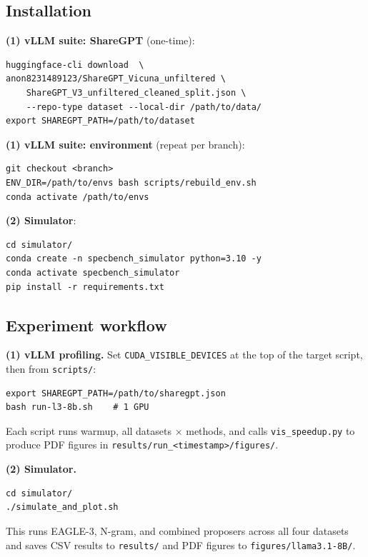 \documentclass{article}
\begin{document}
\subsection{Installation}
\label{sec:ae-install}

\textbf{(1) vLLM suite: ShareGPT} (one-time):
\begin{verbatim}
huggingface-cli download  \
anon8231489123/ShareGPT_Vicuna_unfiltered \
    ShareGPT_V3_unfiltered_cleaned_split.json \
    --repo-type dataset --local-dir /path/to/data/
export SHAREGPT_PATH=/path/to/dataset
\end{verbatim}

\textbf{(1) vLLM suite: environment} (repeat per branch):
\begin{verbatim}
git checkout <branch>
ENV_DIR=/path/to/envs bash scripts/rebuild_env.sh
conda activate /path/to/envs
\end{verbatim}

\textbf{(2) Simulator}:
\begin{verbatim}
cd simulator/
conda create -n specbench_simulator python=3.10 -y
conda activate specbench_simulator
pip install -r requirements.txt
\end{verbatim}

\subsection{Experiment workflow}

\textbf{(1) vLLM profiling.}
Set \texttt{CUDA\_VISIBLE\_DEVICES} at the top of the target script,
then from \texttt{scripts/}:
\begin{verbatim}
export SHAREGPT_PATH=/path/to/sharegpt.json
bash run-l3-8b.sh    # 1 GPU
\end{verbatim}
Each script runs warmup, all datasets $\times$ methods, and calls
\texttt{vis\_speedup.py} to produce PDF figures in
\texttt{results/run\_<timestamp>/figures/}.

\textbf{(2) Simulator.}
\begin{verbatim}
cd simulator/
./simulate_and_plot.sh
\end{verbatim}
This runs EAGLE-3, N-gram, and combined proposers across all four
datasets and saves CSV results to \texttt{results/} and PDF figures to
\texttt{figures/llama3.1-8B/}.

\end{document}
